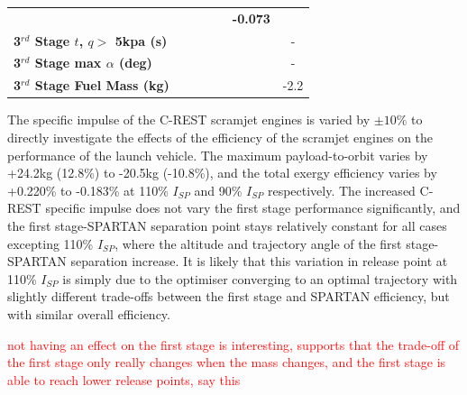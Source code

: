 \begin{table}[ht!]
\begin{tabular}{l c c c c c c}
		& \textbf{\thirddExergyEffIspNinetyFiveNoReturn}
		& \textbf{\thirddExergyEffIspStandardNoReturn}
		& \textbf{\thirddExergyEffIspOneHundredFiveNoReturn}
		& \textbf{\thirddExergyEffIspOneHundredTenNoReturn}
		& \textbf{-0.073}
		\\
		\textbf{3$^{rd}$ Stage $t$, $q >$ 5kpa (s)}
		& \thirdqOverFiveIspNinetyNoReturn
		& \thirdqOverFiveIspNinetyFiveNoReturn
		& \thirdqOverFiveIspStandardNoReturn
		& \thirdqOverFiveIspOneHundredFiveNoReturn
		& \thirdqOverFiveIspOneHundredTenNoReturn
		& -
		\\
		\textbf{3$^{rd}$ Stage max $\alpha$ (deg)}
		& \thirdmaxAoAIspNinetyNoReturn
		& \thirdmaxAoAIspNinetyFiveNoReturn
		& \thirdmaxAoAIspStandardNoReturn
		& \thirdmaxAoAIspOneHundredFiveNoReturn
		& \thirdmaxAoAIspOneHundredTenNoReturn
		& -
		\\
		\textbf{3$^{rd}$ Stage Fuel Mass (kg)}
		& \thirdmFuelIspNinetyNoReturn
		& \thirdmFuelIspNinetyFiveNoReturn
		& \thirdmFuelIspStandardNoReturn
		& \thirdmFuelIspOneHundredFiveNoReturn
		& \thirdmFuelIspOneHundredTenNoReturn
		&-2.2
		\\
		\hline 
	\end{tabular} 
	
\end{table}

The specific impulse of the C-REST scramjet engines is varied by $\pm10\%$ to directly investigate the effects of the efficiency of the scramjet engines on the performance of the launch vehicle. The maximum payload-to-orbit varies by +24.2kg (12.8\%) to -20.5kg (-10.8\%), and the total exergy efficiency varies by +0.220\% to -0.183\% at 110\% $I_{SP}$ and 90\% $I_{SP}$ respectively. 
The increased C-REST specific impulse does not vary the first stage performance significantly, and the first stage-SPARTAN separation point stays relatively constant for all cases excepting 110\% $I_{SP}$, where the altitude and trajectory angle of the first stage-SPARTAN separation increase. It is likely that this variation in release point at 110\% $I_{SP}$ is simply due to the optimiser converging to an optimal trajectory with slightly different trade-offs between the first stage and SPARTAN efficiency, but with similar overall efficiency.  

\textcolor{red}{not having an effect on the first stage is interesting, supports that the trade-off of the first stage only really changes when the mass changes, and the first stage is able to reach lower release points, say this}

